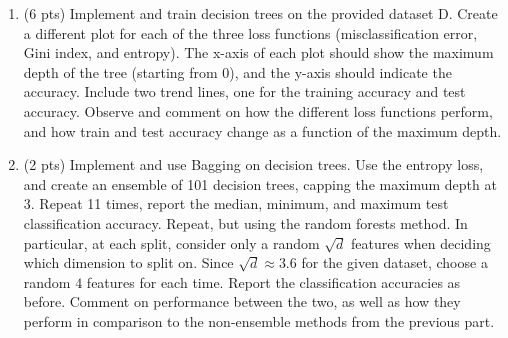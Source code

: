 \documentclass[10pt,letterpaper]{article}
\begin{document}
\begin{exercise}
  \begin{enumerate} [label=\alph*)]
    \item (6 pts) Implement and train decision trees on the provided dataset D. Create a different plot for each of the three loss functions (misclassification error, Gini index, and entropy). The x-axis of each plot should show the maximum depth of the tree (starting from 0), and the y-axis should indicate the accuracy. Include two trend lines, one for the training accuracy and test accuracy. Observe and comment on how the different loss functions perform, and how train and test accuracy change as a function of the maximum depth.
    \item (2 pts) Implement and use Bagging on decision trees. Use the entropy loss, and create an ensemble of 101 decision trees, capping the maximum depth at 3. Repeat 11 times, report the median, minimum, and maximum test classification accuracy.
      Repeat, but using the random forests method. In particular, at each split, consider only a random $\sqrt{d}$ features when deciding which dimension to split on. Since $\sqrt{d} \approx 3.6$ for the given dataset, choose a random $4$ features for each time.
      Report the classification accuracies as before.
      Comment on performance between the two, as well as how they perform in comparison to the non-ensemble methods from the previous part.
  \end{enumerate}
\end{exercise}
\end{document}
